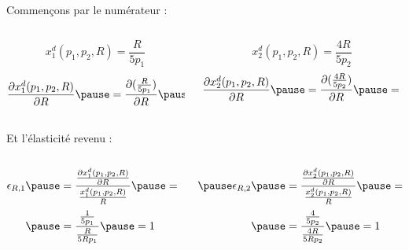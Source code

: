\documentclass[9pt,handout,professionalfonts,hyperref]{beamer}
\begin{document}
\begin{frame}
	Commençons par le numérateur : 
	
	\begin{columns}
		\begin{column}{0.5\textwidth}
			$$x_1^d(p_1,p_2,R) = \frac{R}{5p_1}$$ 
			
			\[\begin{aligned}
			\frac{\partial x_1^d(p_1,p_2,R) }{\partial R} \pause= \frac{\partial (\frac{R}{5p_1}) }{\partial R} \pause= \frac{1}{5p_1}\frac{\partial R}{\partial R} = \frac{1}{5p_1}\\
			\end{aligned}\]
		\end{column}
		\begin{column}{0.5\textwidth}
			\pause	$$x_2^d(p_1,p_2,R) = \frac{4R}{5p_2}$$ 
			\[\begin{aligned}
			\frac{\partial x_2^d(p_1,p_2,R) }{\partial R} \pause= \frac{\partial (\frac{4R}{5p_2}) }{\partial R} \pause= \frac{4}{5p_2}\frac{\partial R}{\partial R}\pause =\frac{4}{5p_2}\\
			\end{aligned}\]
		\end{column}
	\end{columns}
	
	\bigskip 
	
	Et l'élasticité revenu :\newline 
	
	\begin{columns}
		\begin{column}{0.5\textwidth}
			\Large 
			\[\begin{aligned}
			\epsilon_{R,1} 
			\pause&= \frac{\frac{\partial x_1^d(p_1,p_2,R)}{\partial R}}{\frac{x_1^d(p_1,p_2,R) }{R}} \pause= \frac{\frac{1}{5p_1}}{\frac{\frac{R}{5p_1}}{R}} \\
			\pause&= \frac{\frac{1}{5p_1}}{\frac{R}{5Rp_1}} \pause=1
			\end{aligned}\]
		\end{column}
		\begin{column}{0.5\textwidth}
			\Large 
			\[\begin{aligned}
			\pause\epsilon_{R,2} 
			\pause &= \frac{\frac{\partial x_2^d(p_1,p_2,R)}{\partial R}}{\frac{x_2^d(p_1,p_2,R) }{R}} \pause = \frac{\frac{4}{5p_2}}{\frac{\frac{4R}{5p_2}}{R}} \\
			\pause&= \frac{\frac{4}{5p_2}}{\frac{4R}{5Rp_2}} \pause=1
			\end{aligned}\]
		\end{column}
	\end{columns}
	
\end{frame} 
\end{document}
